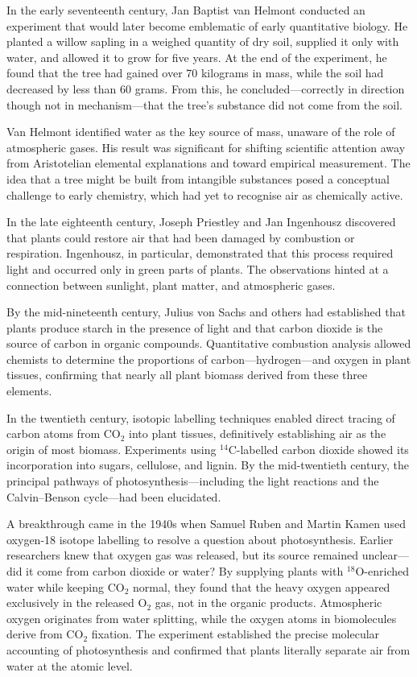 \begin{historical}
In the early seventeenth century, Jan Baptist van Helmont conducted an experiment that would later become emblematic of early quantitative biology. He planted a willow sapling in a weighed quantity of dry soil, supplied it only with water, and allowed it to grow for five years. At the end of the experiment, he found that the tree had gained over 70 kilograms in mass, while the soil had decreased by less than 60 grams. From this, he concluded—correctly in direction though not in mechanism—that the tree's substance did not come from the soil.

Van Helmont identified water as the key source of mass, unaware of the role of atmospheric gases. His result was significant for shifting scientific attention away from Aristotelian elemental explanations and toward empirical measurement. The idea that a tree might be built from intangible substances posed a conceptual challenge to early chemistry, which had yet to recognise air as chemically active.

In the late eighteenth century, Joseph Priestley and Jan Ingenhousz discovered that plants could \QSOpen{}restore\QSClose{} air that had been \QSOpen{}damaged\QSClose{} by combustion or respiration. Ingenhousz, in particular, demonstrated that this process required light and occurred only in green parts of plants. The observations hinted at a connection between sunlight, plant matter, and atmospheric gases.

By the mid-nineteenth century, Julius von Sachs and others had established that plants produce starch in the presence of light and that carbon dioxide is the source of carbon in organic compounds. Quantitative combustion analysis allowed chemists to determine the proportions of carbon—hydrogen—and oxygen in plant tissues, confirming that nearly all plant biomass derived from these three elements.

In the twentieth century, isotopic labelling techniques enabled direct tracing of carbon atoms from \(\mathrm{CO}_2\) into plant tissues, definitively establishing air as the origin of most biomass. Experiments using \(^{14}\mathrm{C}\)-labelled carbon dioxide showed its incorporation into sugars, cellulose, and lignin. By the mid-twentieth century, the principal pathways of photosynthesis—including the light reactions and the Calvin–Benson cycle—had been elucidated.

A breakthrough came in the 1940s when Samuel Ruben and Martin Kamen used oxygen-18 isotope labelling to resolve a question about photosynthesis. Earlier researchers knew that oxygen gas was released, but its source remained unclear—did it come from carbon dioxide or water? By supplying plants with  \(^{18}\mathrm{O}\)-enriched water while keeping \(\mathrm{CO}_2\) normal, they found that the heavy oxygen appeared exclusively in the released \(\mathrm{O}_2\) gas, not in the organic products. Atmospheric oxygen originates from water splitting, while the oxygen atoms in biomolecules derive from \(\mathrm{CO}_2\) fixation. The experiment established the precise molecular accounting of photosynthesis and confirmed that plants literally separate air from water at the atomic level. 
\end{historical}
